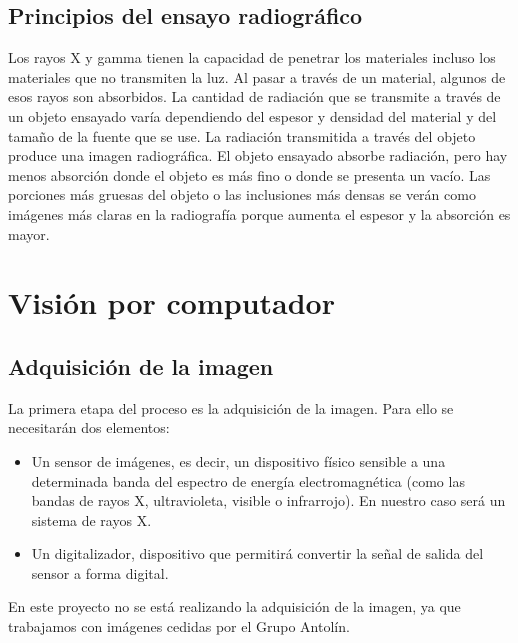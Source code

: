 \subsection{Principios del ensayo radiográfico}
Los rayos X y gamma \cite{wiki:Radiografia} tienen la capacidad de penetrar los materiales incluso los materiales que no transmiten la luz. Al pasar a través de un material, algunos de esos rayos son absorbidos. La cantidad de radiación que se transmite a través de un objeto ensayado varía dependiendo del espesor y densidad del material y del tamaño de la fuente que se use. La radiación transmitida a través del objeto produce una imagen radiográfica. El objeto ensayado absorbe radiación, pero hay menos absorción donde el objeto es más fino o donde se presenta un vacío. Las porciones más gruesas del objeto o las inclusiones más densas se verán como imágenes más claras en la radiografía porque aumenta el espesor y la absorción es mayor.


\section{Visión por computador}

\subsection{Adquisición de la imagen}\label{adquisicion}
La primera etapa del proceso es la adquisición de la imagen. Para ello se necesitarán dos elementos:

\begin{itemize}

\item Un sensor de imágenes, es decir, un dispositivo físico sensible a una determinada banda del espectro de energía electromagnética (como las bandas de rayos X, ultravioleta, visible o
infrarrojo). En nuestro caso será un sistema de rayos X.

\item Un digitalizador, dispositivo que permitirá convertir la señal de salida del sensor a forma digital.

\end{itemize}


En este proyecto no se está realizando la adquisición de la imagen, ya que trabajamos con imágenes cedidas por el Grupo Antolín.


